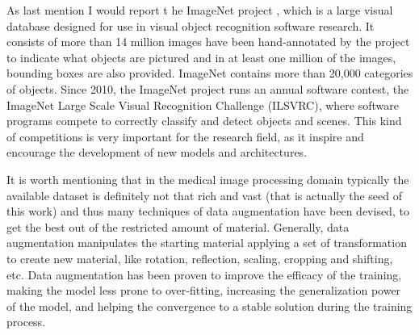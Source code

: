 As last mention I would report t he ImageNet project \cite{5206848}, which is a large visual database designed for use in visual object recognition software research. It consists of more than 14 million images have been hand-annotated by the project to indicate what objects are pictured and in at least one million of the images, bounding boxes are also provided. ImageNet contains more than 20,000 categories of objects. Since 2010, the ImageNet project runs an annual software contest, the ImageNet Large Scale Visual Recognition Challenge (ILSVRC), where software programs compete to correctly classify and detect objects and scenes. This kind of competitions is very important for the research field, as it inspire and encourage the development of new models and architectures.

It is worth mentioning that in the medical image processing domain typically the available dataset is definitely not that rich and vast (that is actually the seed of this work) and thus many techniques of data augmentation have been devised, to get the best out of the restricted amount of material. Generally, data augmentation manipulates the starting material applying a set of transformation to create new material, like rotation, reflection, scaling, cropping and shifting, etc. Data augmentation has been proven to improve the efficacy of the training, making the model less prone to over-fitting, increasing the generalization power of the model, and helping the convergence to a stable solution during the training process.
